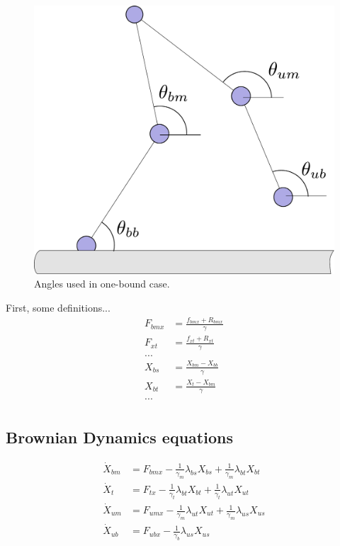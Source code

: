 \documentclass[11pt,twocolumn]{article}
\newcommand{\gb}{\frac{1}{\gamma_b}}
\newcommand{\gm}{\frac{1}{\gamma_m}}
\newcommand{\gt}{\frac{1}{\gamma_t}}
\begin{document}
\begin{figure}
  \includegraphics[width=\columnwidth]{../figures/code-onebound}
  \caption{Angles used in one-bound case.}\label{fig:onebound}
\end{figure}

First, some definitions...
\begin{align*}
F_{bmx} &= \frac{f_{bmx} + R_{bmx}}{\gamma}\\
F_{xt } &= \frac{f_{xt} + R_{xt}}{\gamma}\\
...\\
X_{bs} &= \frac{X_{bm} - X_{bb}}{\gamma}\\
X_{bt} &= \frac{X_t - X_{bm}}{\gamma}\\
...\\
\end{align*}

\subsection{Brownian Dynamics equations}
\begin{align*}
  \dot{X}_{bm} &= F_{bmx} - \gm\lambda_{bs}X_{bs} + \gm\lambda_{bt}X_{bt}\\
  \dot{X}_{t}  &= F_{tx}  - \gt\lambda_{bt}X_{bt} + \gt\lambda_{ut}X_{ut}\\
  \dot{X}_{um} &= F_{umx} - \gm\lambda_{ut}X_{ut} + \gm\lambda_{us}X_{us}\\
  \dot{X}_{ub} &= F_{ubx} - \gb\lambda_{us}X_{us}
\end{align*}
\end{document}
